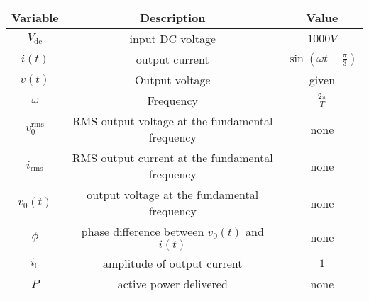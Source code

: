 \begin{tabular}{|c|c|c|} 
    \hline
    \textbf{Variable} & \textbf{Description} & \textbf{Value} \\
    \hline
    $V_\text{dc}$ & input DC voltage & $1000V$ \\
    \hline
    $i(t)$ & output current & $\sin(\omega t-\frac{\pi}{3})$ \\
    \hline
    $v(t)$ & Output voltage & given \\
    \hline 
    $\omega$& Frequency &  $\frac{2\pi}{T}$     \\
    \hline
       $v_{0}^{\text{rms}}$&  RMS output voltage at the fundamental frequency& none\\
    \hline
    $i_{\text{rms}}$&  RMS output current at the fundamental frequency& none\\
    \hline
     $v_{0}(t)$&  output voltage at the fundamental frequency& none\\
    \hline
    $\phi$ & phase difference between $v_{0}(t)$ and $i(t)$&none\\
    \hline
    $i_{0}$& amplitude of output current & $1$\\
    \hline
    $P$&        active power delivered&none\\
    \hline
\end{tabular}
